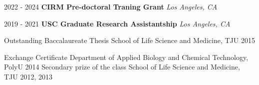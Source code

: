 
\begin{rSection}{}
{\hspace{-0.5em}2022 - 2024\hspace{1em}}{\bodyfont\bfseries\color{darktext} {CIRM Pre-doctoral Traning Grant}}\hfill{\bodyfont\slshape\color{awesome} {Los Angeles, CA}}
\end{rSection}

\begin{rSection}{}
{\hspace{-0.5em}2019 - 2021\hspace{1em}}{\bodyfont\bfseries\color{darktext} {USC Graduate Research Assistantship}}\hfill{\bodyfont\slshape\color{awesome} {Los Angeles, CA}}
\end{rSection}


\begin{cvhonors}

  \cvhonor
    {Outstanding Baccalaureate Thesis} %
    {School of Life Science and Medicine, TJU} %
    {\hspace{-2em}} %
    {2015} %
    
  \cvhonor
    {Exchange Certificate} %
    {Department of Applied Biology and Chemical Technology, PolyU} %
    {\hspace{-2em}} %
    {2014} %
  \cvhonor
    {Secondary prize of the class} %
    {School of Life Science and Medicine, TJU} %
    {\hspace{-2em}} %
    {2012, 2013} %


\end{cvhonors}


